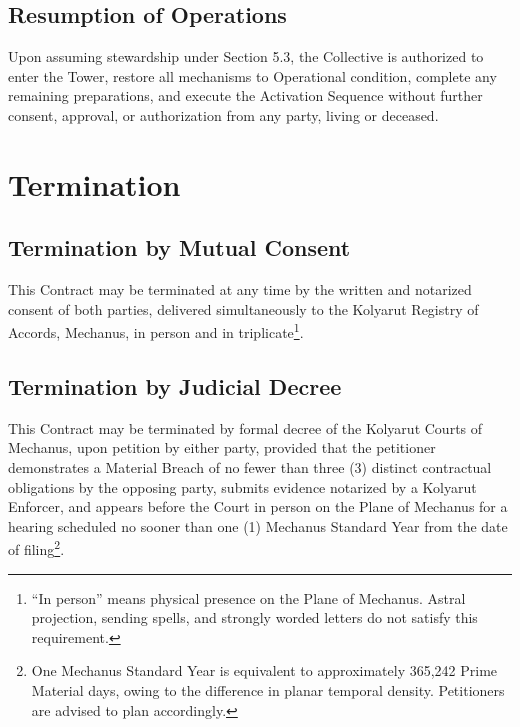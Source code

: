\documentclass[12pt]{article}
\begin{document}
\subsection{Resumption of Operations}
Upon assuming stewardship under Section 5.3, the Collective is
authorized to enter the Tower, restore all mechanisms to Operational
condition, complete any remaining preparations, and execute the
Activation Sequence without further consent, approval, or
authorization from any party, living or deceased.


\section{Termination}

\subsection{Termination by Mutual Consent}
This Contract may be terminated at any time by the written and
notarized consent of both parties, delivered simultaneously to the
Kolyarut Registry of Accords, Mechanus, in person and in
triplicate\footnote{``In person'' means physical presence on the
Plane of Mechanus. Astral projection, sending spells, and strongly
worded letters do not satisfy this requirement.}.

\subsection{Termination by Judicial Decree}
This Contract may be terminated by formal decree of the Kolyarut
Courts of Mechanus, upon petition by either party, provided that the
petitioner demonstrates a Material Breach of no fewer than three (3)
distinct contractual obligations by the opposing party, submits
evidence notarized by a Kolyarut Enforcer, and appears before the
Court in person on the Plane of Mechanus for a hearing scheduled no
sooner than one (1) Mechanus Standard Year from the date of
filing\footnote{One Mechanus Standard Year is equivalent to
approximately 365,242 Prime Material days, owing to the difference
in planar temporal density. Petitioners are advised to plan
accordingly.}.
\end{document}
